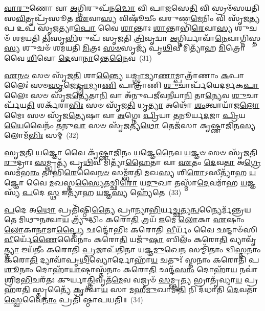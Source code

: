 \-\ul{𑌵𑌾}\-\-\ul{𑌰𑍁}\-𑌣𑍋 𑌵𑌾 \ul{𑌅}\-𑌗𑍍𑌨𑌿𑌰𑍁𑌪᳴𑌨\-\ul{𑌦𑍍𑌧𑍋} 𑌵𑌿 𑌪𑌾\-\ul{𑌜}\-𑌸𑍇\-\ul{𑌤𑌿} 𑌵𑌿 𑌸𑍍𑌰𑍞᳴𑌸𑌯𑌤𑌿 𑌸\-\ul{𑌵𑌿}\-𑌤𑍃𑌪𑍍𑌰᳴𑌸𑍂𑌤 \ul{𑌏}\-𑌵𑌾\-\ul{𑌸𑍍𑌯} 𑌵𑌿𑌷𑍂᳴𑌚𑍀𑌂 𑌵𑌰𑍁𑌣\-\ul{𑌮𑍇}\-𑌨𑌿𑌂 𑌵𑌿 𑌸𑍃᳴𑌜\-\ul{𑌤𑍍𑌯}\-𑌪 𑌉𑌪᳴ 𑌸𑍃\-\ul{𑌜}\-𑌤𑍍𑌯𑌾\-\ul{𑌪𑍋} 𑌵𑍈 \ul{𑌶𑌾}\-𑌨𑍍𑌤𑌾𑌃 \ul{𑌶𑌾}\-𑌨𑍍𑌤𑌾𑌭𑌿᳴\-\ul{𑌰𑍇}\-𑌵𑌾\-\ul{𑌸𑍍𑌯} 𑌶𑍁𑌚𑍞᳴ 𑌶𑌮𑌯𑌤𑌿 \ul{𑌤𑌿}\-𑌸𑍃\-\ul{𑌭𑌿}\-𑌰𑍁𑌪᳴ 𑌸𑍃𑌜𑌤𑌿 \ul{𑌤𑍍𑌰𑌿}\-𑌵𑍃𑌦𑍍𑌵𑌾 \ul{𑌅}\-𑌗𑍍𑌨𑌿𑌰𑍍𑌯𑌾𑌵𑌾᳴\-\ul{𑌨𑍇}\-𑌵𑌾𑌗𑍍𑌨𑌿𑌸𑍍𑌤\-\ul{𑌸𑍍𑌯} 𑌶𑍁𑌚𑍞᳴ 𑌶𑌮𑌯𑌤𑌿 \ul{𑌮𑌿}\-𑌤𑍍𑌰𑌃 \ul{𑌸}\-\-\ul{𑍞}\-𑌸𑍃𑌜𑍍𑌯᳴ 𑌪𑍃\-\ul{𑌥𑌿}\-𑌵𑍀𑌮𑌿𑌤𑍍𑌯𑌾᳴𑌹 \ul{𑌮𑌿}\-𑌤𑍍𑌰𑍋 𑌵𑍈 \ul{𑌶𑌿}\-𑌵𑍋 \ul{𑌦𑍇}\-𑌵𑌾\-\ul{𑌨𑌾}\-𑌨𑍍𑌤𑍇\-\ul{𑌨𑍈}\-𑌵~(31)

\-\ul{𑌏}\-\-\ul{𑌨}\-\-\ul{𑍞} 𑌸𑍞 𑌸𑍃᳴𑌜\-\ul{𑌤𑌿} 𑌶𑌾\-\ul{𑌨𑍍𑌤𑍍𑌯𑍈} 𑌯\-\ul{𑌦𑍍𑌗𑍍𑌰𑌾}\-𑌮𑍍𑌯𑌾\-\ul{𑌣𑌾}\-𑌮𑍍𑌪𑌾𑌤𑍍𑌰𑌾᳴𑌣𑌾𑌂 \ul{𑌕}\-𑌪𑌾𑌲𑍈𑌃॑ 𑌸𑍞\-\ul{𑌸𑍃}\-𑌜𑍇\-\ul{𑌦𑍍𑌗𑍍𑌰𑌾}\-𑌮𑍍𑌯𑌾\-\ul{𑌣𑌿} 𑌪𑌾𑌤𑍍𑌰𑌾᳴𑌣𑌿 \ul{𑌶𑍁}\-𑌚𑌾𑌰𑍍𑌪᳴𑌯𑍇𑌦𑌰𑍍𑌮𑌕\-\ul{𑌪𑌾}\-𑌲𑍈𑌃 𑌸𑍞 𑌸𑍃᳴𑌜\-\ul{𑌤𑍍𑌯𑍇}\-𑌤𑌾\-\ul{𑌨𑌿} 𑌵𑌾 𑌅᳴𑌨𑍁𑌪𑌜𑍀𑌵\-\ul{𑌨𑍀}\-𑌯𑌾\-\ul{𑌨𑌿} 𑌤𑌾\-\ul{𑌨𑍍𑌯𑍇}\-𑌵 \ul{𑌶𑍁}\-𑌚𑌾𑌰𑍍𑌪᳴𑌯\-\ul{𑌤𑌿} 𑌶𑌰𑍍𑌕᳴𑌰𑌾\-\ul{𑌭𑌿𑌃} 𑌸𑍞 𑌸𑍃᳴𑌜\-\ul{𑌤𑌿} 𑌧𑍃\-\ul{𑌤𑍍𑌯𑌾} 𑌅𑌥𑍋᳴ \ul{𑌶𑌂}\-𑌤𑍍𑌵𑌾𑌯𑌾᳴𑌜\-\ul{𑌲𑍋}\-𑌮𑍈𑌃 𑌸𑍞 𑌸𑍃᳴𑌜\-\ul{𑌤𑍍𑌯𑍇}\-𑌷𑌾 𑌵𑌾 \ul{𑌅}\-𑌗𑍍𑌨𑍇𑌃 \ul{𑌪𑍍𑌰𑌿}\-𑌯𑌾 \ul{𑌤}\-𑌨𑍂𑌰𑍍𑌯\-\ul{𑌦}\-𑌜𑌾 \ul{𑌪𑍍𑌰𑌿}\-𑌯\-\ul{𑌯𑍈}\-𑌵𑍈𑌨𑌂᳴ \ul{𑌤}\-𑌨𑍁\-\ul{𑌵𑌾} 𑌸𑍞 𑌸𑍃᳴\-\ul{𑌜}\-𑌤𑍍𑌯\-\ul{𑌥𑍋} 𑌤𑍇𑌜᳴𑌸𑌾 𑌕𑍃𑌷𑍍𑌣𑌾\-\ul{𑌜𑌿}\-𑌨\-\ul{𑌸𑍍𑌯} 𑌲𑍋𑌮᳴\-\ul{𑌭𑌿𑌃} 𑌸𑌮𑍍~(32)

\-\ul{𑌸𑍃}\-\-\ul{𑌜}\-\-\ul{𑌤𑌿} \ul{𑌯}\-𑌜𑍍𑌞𑍋 𑌵𑍈 𑌕𑍃᳴𑌷𑍍𑌣𑌾\-\ul{𑌜𑌿}\-𑌨𑌂 \ul{𑌯}\-𑌜𑍍𑌞𑍇\-\ul{𑌨𑍈}\-𑌵 \ul{𑌯}\-𑌜𑍍𑌞𑍞 𑌸𑍞 𑌸𑍃᳴𑌜𑌤𑌿 \ul{𑌰𑍁}\-𑌦𑍍𑌰𑌾𑌃 \ul{𑌸}\-𑌮𑍍𑌭𑍃𑌤𑍍𑌯᳴ 𑌪𑍃\-\ul{𑌥𑌿}\-𑌵𑍀𑌮𑌿𑌤𑍍𑌯𑌾᳴\-\ul{𑌹𑍈}\-𑌤𑌾 𑌵𑌾 \ul{𑌏}\-𑌤𑌂 \ul{𑌦𑍇}\-𑌵\-\ul{𑌤𑌾} 𑌅\-\ul{𑌗𑍍𑌰𑍇} 𑌸𑌮᳴𑌭\-\ul{𑌰𑌂} 𑌤𑌾𑌭𑌿᳴\-\ul{𑌰𑍇}\-𑌵𑍈\-\ul{𑌨}\-\-\ul{𑍞} 𑌸𑌮𑍍𑌭᳴𑌰𑌤𑌿 \ul{𑌮}\-𑌖\-\ul{𑌸𑍍𑌯} 𑌶𑌿\-\ul{𑌰𑍋}\-\-𑌽𑌸𑍀𑌤𑍍𑌯𑌾᳴𑌹 \ul{𑌯}\-𑌜𑍍𑌞𑍋 𑌵𑍈 \ul{𑌮}\-𑌖𑌸𑍍𑌤\-\ul{𑌸𑍍𑌯𑍈}\-𑌤𑌚𑍍𑌛𑌿\-\ul{𑌰𑍋} 𑌯\-\ul{𑌦𑍁}\-𑌖𑌾 𑌤𑌸𑍍𑌮𑌾᳴\-\ul{𑌦𑍇}\-𑌵𑌮𑌾᳴𑌹 \ul{𑌯}\-𑌜𑍍𑌞𑌸𑍍𑌯᳴ \ul{𑌪}\-𑌦𑍇 \ul{𑌸𑍍𑌥} 𑌇𑌤𑍍𑌯𑌾᳴𑌹 \ul{𑌯}\-𑌜𑍍𑌞\-\ul{𑌸𑍍𑌯} 𑌹𑍍𑌯𑍇᳴𑌤𑍇~(33)

\-\ul{𑌪}\-𑌦𑍇 𑌅\-\ul{𑌥𑍋} 𑌪𑍍𑌰𑌤𑌿᳴𑌷𑍍𑌠𑌿\-\ul{𑌤𑍍𑌯𑍈} 𑌪𑍍𑌰𑌾𑌨𑍍𑌯𑌾\-\ul{𑌭𑌿}\-𑌰𑍍𑌯\-\ul{𑌚𑍍𑌛}\-𑌤𑍍𑌯\-\ul{𑌨𑍍𑌵}\-𑌨𑍍𑌯𑍈𑌰𑍍𑌮᳴𑌨𑍍𑌤𑍍𑌰𑌯𑌤𑍇 𑌮𑌿𑌥𑍁\-\ul{𑌨}\-𑌤𑍍𑌵𑌾\-\ul{𑌯} 𑌤𑍍𑌰𑍍𑌯𑍁᳴𑌦𑍍𑌧𑌿𑌂 𑌕𑌰𑍋\-\ul{𑌤𑌿} 𑌤𑍍𑌰𑌯᳴ \ul{𑌇}\-𑌮𑍇 \ul{𑌲𑍋}\-𑌕𑌾 \ul{𑌏}\-𑌷𑌾𑌂 \ul{𑌲𑍋}\-𑌕𑌾\-\ul{𑌨𑌾}\-𑌮𑌾\-\ul{𑌪𑍍𑌤𑍍𑌯𑍈} 𑌛𑌨𑍍𑌦𑍋᳴𑌭𑌿𑌃 𑌕𑌰𑍋𑌤𑌿 \ul{𑌵𑍀}\-𑌰𑍍𑌯𑌂᳴ 𑌵𑍈 𑌛𑌨𑍍𑌦𑌾𑍞᳴𑌸𑌿 \ul{𑌵𑍀}\-𑌰𑍍𑌯𑍇᳴\-\ul{𑌣𑍈}\-𑌵𑍈𑌨𑌾𑌂॑ 𑌕𑌰𑍋\-\ul{𑌤𑌿} 𑌯𑌜𑍁᳴\-\ul{𑌷𑌾} 𑌬𑌿𑌲𑌂᳴ 𑌕𑌰𑍋\-\ul{𑌤𑌿} 𑌵𑍍𑌯𑌾𑌵𑍃᳴\-\ul{𑌤𑍍𑌤𑍍𑌯𑌾} 𑌇𑌯᳴𑌤𑍀𑌂 𑌕𑌰𑍋𑌤𑌿 \ul{𑌪𑍍𑌰}\-𑌜𑌾𑌪᳴𑌤𑌿𑌨𑌾 𑌯𑌜𑍍𑌞\-\ul{𑌮𑍁}\-𑌖𑍇\-\ul{𑌨} 𑌸𑌮𑍍𑌮𑌿᳴𑌤𑌾𑌂 𑌦𑍍𑌵𑌿\-\ul{𑌸𑍍𑌤}\-𑌨𑌾𑌂 𑌕᳴𑌰𑍋\-\ul{𑌤𑌿} 𑌦𑍍𑌯𑌾𑌵𑌾᳴𑌪𑍃\-\ul{𑌥𑌿}\-𑌵𑍍𑌯𑍋𑌰𑍍𑌦𑍋𑌹𑌾᳴\-\ul{𑌯} 𑌚𑌤𑍁𑌃᳴ 𑌸𑍍𑌤𑌨𑌾𑌂 𑌕𑌰𑍋𑌤𑌿 𑌪\-\ul{𑌶𑍂}\-𑌨𑌾𑌂 𑌦𑍋𑌹𑌾᳴\-\ul{𑌯𑌾}\-𑌷𑍍𑌟𑌾𑌸𑍍𑌤᳴𑌨𑌾𑌂 𑌕𑌰𑍋\-\ul{𑌤𑌿} 𑌛𑌨𑍍𑌦᳴\-\ul{𑌸𑌾𑌂} 𑌦𑍋𑌹𑌾᳴\-\ul{𑌯} 𑌨𑌵𑌾॑𑌶𑍍𑌰𑌿𑌮\-\ul{𑌭𑌿}\-𑌚𑌰᳴𑌤𑌃 𑌕𑍁𑌰𑍍𑌯𑌾\-\ul{𑌤𑍍𑌤𑍍𑌰𑌿}\-𑌵𑍃𑌤᳴\-\ul{𑌮𑍇}\-𑌵 𑌵𑌜𑍍𑌰𑍞᳴ \ul{𑌸}\-𑌮𑍍𑌭𑍃\-\ul{𑌤𑍍𑌯} 𑌭𑍍𑌰𑌾𑌤𑍃᳴𑌵𑍍𑌯𑌾\-\ul{𑌯} 𑌪𑍍𑌰 𑌹᳴𑌰\-\ul{𑌤𑌿} 𑌸𑍍𑌤𑍃𑌤𑍍𑌯𑍈᳴ \ul{𑌕𑍃}\-𑌤𑍍𑌵𑌾\-\ul{𑌯} 𑌸𑌾 \ul{𑌮}\-𑌹𑍀\-\ul{𑌮𑍁}\-𑌖𑌾𑌮𑌿\-\ul{𑌤𑌿} 𑌨𑌿 𑌦᳴𑌧𑌾𑌤𑌿 \ul{𑌦𑍇}\-𑌵𑌤𑌾॑\-\ul{𑌸𑍍𑌵𑍇}\-𑌵𑍈\-\ul{𑌨𑌾𑌂} 𑌪𑍍𑌰𑌤𑌿᳴ 𑌷𑍍𑌠𑌾𑌪𑌯𑌤𑌿॥~(34)

